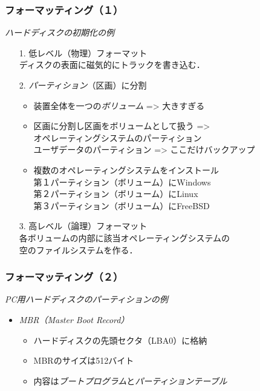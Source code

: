 \documentclass[unicode,handout]{beamer}                   %
\begin{document}
\begin{frame}
  \frametitle{フォーマッティング（１）}
  \emph{ハードディスクの初期化の例}
  \begin{itemize}
    \item[1.] 低レベル（物理）フォーマット \\
      ディスクの表面に磁気的にトラックを書き込む．
    \item[2.] \emph{パーティション}（区画）に分割 \\
      \begin{itemize}
      \item 装置全体を一つの\emph{ボリューム} => 大きすぎる
      \item 区画に分割し区画をボリュームとして扱う => \\
        オペレーティングシステムのパーティション \\
        ユーザデータのパーティション => ここだけバックアップ
      \item 複数のオペレーティングシステムをインストール \\
        第１パーティション（ボリューム）にWindows \\
        第２パーティション（ボリューム）にLinux \\
        第３パーティション（ボリューム）にFreeBSD
      \end{itemize}
    \item[3.] 高レベル（論理）フォーマット \\
      各ボリュームの内部に該当オペレーティングシステムの \\
      空のファイルシステムを作る．
  \end{itemize}
\end{frame}

\begin{frame}
  \frametitle{フォーマッティング（２）}
  \emph{PC用ハードディスクのパーティションの例}
  \begin{itemize}
  \item \emph{MBR（Master Boot Record）} \\
    \begin{itemize}
    \item ハードディスクの先頭セクタ（LBA0）に格納
    \item MBRのサイズは512バイト
    \item 内容は\emph{ブートプログラム}と\emph{パーティションテーブル}
    \end{itemize}
  \end{itemize}
\end{frame}
\end{document}
